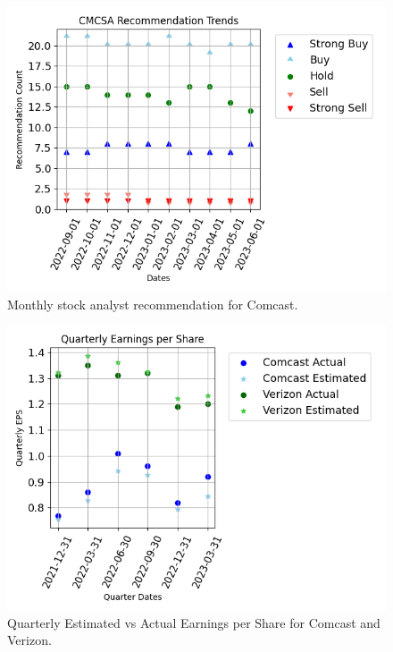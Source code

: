 \documentclass[conference]{IEEEtran}
\begin{document}
\begin{figure}
    \includegraphics[width=\columnwidth]{trends}
    \caption{Monthly stock analyst recommendation for Comcast.}
\end{figure}

\begin{figure}
    \includegraphics[width=\columnwidth]{earnings}
    \caption{Quarterly Estimated vs Actual Earnings per Share for Comcast and Verizon.}
\end{figure}
\end{document}
